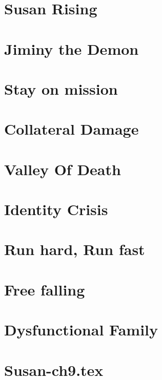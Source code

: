 \chapter{Susan Rising}

\chapter{Jiminy the Demon}

\chapter{Stay on mission}

\chapter{Collateral Damage}

\chapter{Valley Of Death}

\chapter{Identity Crisis}

\chapter{Run hard, Run fast}

\chapter{Free falling}

\chapter{Dysfunctional Family}
\chapter{Susan-ch9.tex}